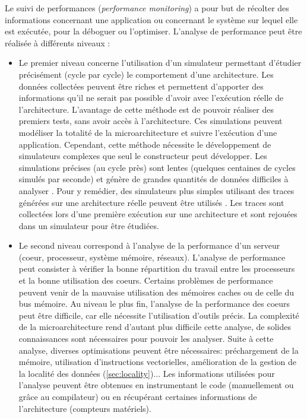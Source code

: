         Le suivi de performances (\textit{performance monitoring}) a pour but de récolter des informations concernant une application ou concernant le système sur lequel elle est exécutée, pour la déboguer ou l'optimiser. L'analyse de performance peut être réalisée à différents niveaux \cite{imbert2011tips} : 
        \begin{itemize}
            \item Le premier niveau concerne l'utilisation d'un simulateur permettant d'étudier précisément (cycle par cycle) le comportement d'une architecture. Les données collectées peuvent être riches et permettent d'apporter des informations qu'il ne serait pas possible d'avoir avec l'exécution réelle de l'architecture. L'avantage de cette méthode est de pouvoir réaliser des premiers tests, sans avoir accès à l'architecture. Ces simulations peuvent modéliser la totalité de la microarchitecture et suivre l'exécution d'une application. Cependant, cette méthode nécessite le développement de simulateurs complexes que seul le constructeur peut développer. Les simulations précises (au cycle près) sont lentes (quelques centaines de cycles simulés par seconde) et génère de grandes quantités de données difficiles à analyser \cite{palomares2015combining}. Pour y remédier, des simulateurs plus simples utilisant des traces générées sur une architecture réelle peuvent être utilisés \cite{Cmelik1995}. Les traces sont collectées lors d'une première exécution sur une architecture et sont rejouées dans un simulateur pour être étudiées.
            
            \item Le second niveau correspond à l'analyse de la performance d'un serveur (coeur, processeur, système mémoire, réseaux). L'analyse de performance peut consister à vérifier la bonne répartition du travail entre les processeurs et la bonne utilisation des coeurs. Certains problèmes de performance peuvent venir de la mauvaise utilisation des mémoires caches ou de celle du bus mémoire. Au niveau le plus fin, l'analyse de la performance des coeurs peut être difficile, car elle nécessite l'utilisation d'outils précis. La complexité de la microarchitecture rend d'autant plus difficile cette analyse, de solides connaissances sont nécessaires pour pouvoir les analyser. Suite à cette analyse, diverses optimisations peuvent être nécessaires: préchargement de la mémoire, utilisation d'instructions vectorielles, amélioration de la gestion de la localité des données (\autoref{sec:locality})... Les informations utilisées pour l'analyse peuvent être obtenues en instrumentant le code (manuellement ou grâce au compilateur) ou en récupérant certaines informations de l'architecture (compteurs matériels).
            

\end{itemize}
